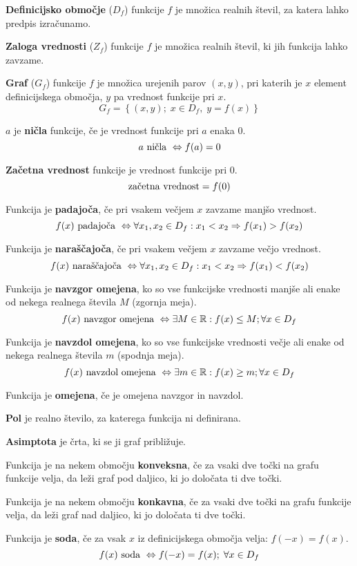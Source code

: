 \documentclass[a4paper,oneside,12pt,fleqn]{article}
\def\R{\ensuremath{\mathbb R}}
\renewcommand\implies\Rightarrow
\renewcommand\iff\Leftrightarrow
\numberwithin{equation}{section}
\begin{document}
\textbf{Definicijsko območje} ($D_f$) funkcije $f$ je množica realnih števil, za katera lahko
predpis izračunamo.

\textbf{Zaloga vrednosti} ($Z_f$) funkcije $f$ je množica realnih števil, ki jih funkcija lahko
zavzame.

\textbf{Graf} ($G_f$) funkcije $f$ je množica urejenih parov $(x, y)$, pri katerih je $x$ element
definicijskega območja, $y$ pa vrednost funkcije pri $x$.
\[ G_f = \left\{ (x,y); \; x \in D_f, \; y = f(x) \right\} \]

$a$ je \textbf{ničla} funkcije, če je vrednost funkcije pri $a$ enaka 0.
\[ a \textnormal{ ničla } \iff f(a) = 0 \]

\textbf{Začetna vrednost} funkcije je vrednost funkcije pri 0.
\[ \textnormal{začetna vrednost} = f(0) \]

Funkcija je \textbf{padajoča}, če pri vsakem večjem $x$ zavzame manjšo vrednost.
\[ f(x) \textnormal{ padajoča } \iff \forall x_1, x_2 \in D_f: x_1 < x_2 \implies f(x_1) >
f(x_2) \]

Funkcija je \textbf{naraščajoča}, če pri vsakem večjem $x$ zavzame večjo vrednost.
\[ f(x) \textnormal{ naraščajoča } \iff \forall x_1, x_2 \in D_f: x_1 < x_2 \implies f(x_1) <
f(x_2) \]

Funkcija je \textbf{navzgor omejena}, ko so vse funkcijske vrednosti manjše ali enake od nekega
realnega števila $M$ (zgornja meja).
\[ f(x) \textnormal{ navzgor omejena } \iff \exists M \in \R: f(x) \leq M; \forall x \in D_f \]


Funkcija je \textbf{navzdol omejena}, ko so vse funkcijske vrednosti večje ali enake od nekega
realnega števila $m$ (spodnja meja).
\[ f(x) \textnormal{ navzdol omejena } \iff \exists m \in \R: f(x) \geq m; \forall x \in D_f \]

Funkcija je \textbf{omejena}, če je omejena navzgor in navzdol.

\textbf{Pol} je realno število, za katerega funkcija ni definirana. 

\textbf{Asimptota} je črta, ki se ji graf približuje.

Funkcija je na nekem območju \textbf{konveksna}, če za vsaki dve točki na grafu funkcije
velja, da leži graf pod daljico, ki jo določata ti dve točki.

Funkcija je na nekem območju \textbf{konkavna}, če za vsaki dve točki na grafu funkcije velja, da
leži graf nad daljico, ki jo določata ti dve točki.

Funkcija je \textbf{soda}, če za vsak $x$ iz definicijskega območja velja: $f(-x) = f(x)$.
\[ f(x) \textnormal{ soda } \iff f(-x) = f(x); \; \forall x \in D_f \]
\end{document}
